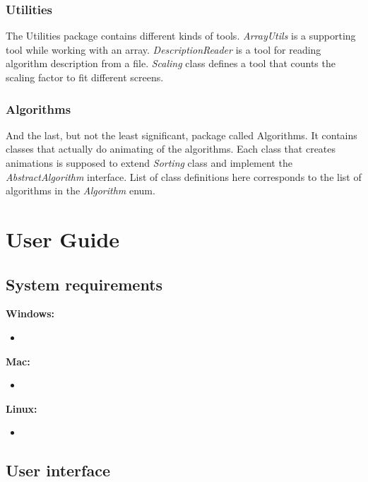 \documentclass[
  field=inf,
  biblatex,
  language=english,
  glossaries,
  theorems=false,
  index
]{kidiplom}
\begin{document}
\subsubsection{Utilities}
The Utilities package contains different kinds of tools. \textit{ArrayUtils} is a supporting tool while working with an array. \textit{DescriptionReader} is a tool for reading algorithm description from a file. \textit{Scaling} class defines a tool that counts the scaling factor to fit different screens.

\subsubsection{Algorithms}
And the last, but not the least significant, package called Algorithms. It contains classes that actually do animating of the algorithms. Each class that creates animations is supposed to extend \textit{Sorting} class and implement the \textit{AbstractAlgorithm} interface. List of class definitions here corresponds to the list of algorithms in the \textit{Algorithm} enum.



\newpage
\section{User Guide}

\subsection{System requirements}

\noindent \textbf{Windows:}
\begin{itemize}
	\item 
\end{itemize}

\noindent \textbf{Mac:}
\begin{itemize}
	\item
\end{itemize}

\noindent \textbf{Linux:}
\begin{itemize}
	\item
\end{itemize}

\subsection{User interface}
\end{document}
